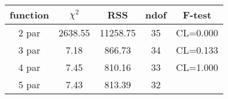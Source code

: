 \begin{tabular}{c|c|c|c|c}
function & $\chi^2$ & RSS & ndof & F-test \\
\hline
2 par & 2638.55 & 11258.75 & 35 & CL=0.000 \\
3 par & 7.18 & 866.73 & 34 & CL=0.133 \\
4 par & 7.45 & 810.16 & 33 & CL=1.000 \\
5 par & 7.43 & 813.39 & 32 & \\
\hline
\end{tabular}